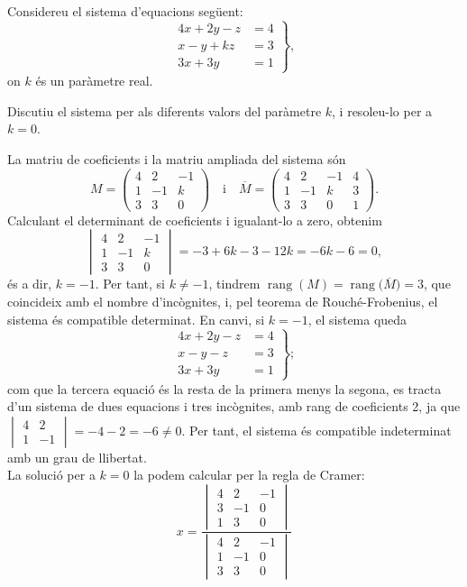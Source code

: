 Considereu el sistema d'equacions següent:
\[
\left.\begin{aligned}
4x+2y-z&=4\\
x-y+kz&=3\\
3x+3y&=1
\end{aligned}\right\},
\]
on $k$ és un paràmetre real.

\begin{apartats}

Discutiu el sistema per als diferents valors del paràmetre $k$, i resoleu-lo per a $k=0$.

\begin{solucio}
La matriu de coeficients i la matriu ampliada del sistema són
\[
M=\begin{pmatrix}4&2&-1\\1&-1&k\\3&3&0\end{pmatrix}\quad\text{i}\quad
\overline{M}=\begin{pmatrix}4&2&-1&4\\1&-1&k&3\\3&3&0&1\end{pmatrix}.
\]
Calculant el determinant de coeficients i igualant-lo a zero, obtenim
\[
\begin{vmatrix}4&2&-1\\1&-1&k\\3&3&0\end{vmatrix}=-3+6k-3-12k=-6k-6=0,
\]
és a dir, $k=-1$. Per tant, si $k\neq-1$, tindrem $\operatorname{rang}(M)=\operatorname{rang}\bigl(\overline{M}\bigr)=3$,
que coincideix amb el nombre d'incògnites, i, pel teorema de Rouché-Frobenius, el sistema és compatible
determinat. En canvi, si $k=-1$, el sistema queda
\[
\left.\begin{aligned}4x+2y-z&=4\\x-y-z&=3\\3x+3y&=1\end{aligned}\right\};
\]
com que la tercera equació és la resta de la primera menys la segona, es tracta d'un sistema de dues equacions i
tres incògnites, amb rang de coeficients 2, ja que $\begin{vmatrix}4&2\\1&-1\end{vmatrix}=-4-2=-6\neq0$. Per tant,
el sistema és compatible indeterminat amb un grau de llibertat.\\
La solució per a $k=0$ la podem calcular per la regla de Cramer:
\[
x=\frac{\begin{vmatrix}4&2&-1\\3&-1&0\\1&3&0\end{vmatrix}}{\begin{vmatrix}4&2&-1\\1&-1&0\\3&3&0\end{vmatrix}}
\]
\end{solucio}
\end{apartats}
